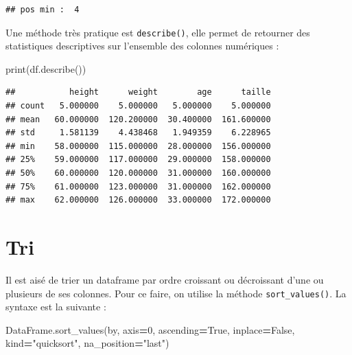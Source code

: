 \documentclass[
  12pt,
]{book}
\newenvironment{Shaded}{\begin{snugshade}}{\end{snugshade}}
\newcommand{\BuiltInTok}[1]{#1}
\newcommand{\DecValTok}[1]{\textcolor[rgb]{0.00,0.00,0.81}{#1}}
\newcommand{\NormalTok}[1]{#1}
\newcommand{\OperatorTok}[1]{\textcolor[rgb]{0.81,0.36,0.00}{\textbf{#1}}}
\newcommand{\StringTok}[1]{\textcolor[rgb]{0.31,0.60,0.02}{#1}}
\newcommand{\VariableTok}[1]{\textcolor[rgb]{0.00,0.00,0.00}{#1}}
\numberwithin{equation}{section}
\numberwithin{countremarque}{section}
\begin{document}
\begin{lstlisting}
## pos min :  4
\end{lstlisting}

Une méthode très pratique est \texttt{describe()}, elle permet de retourner des statistiques descriptives sur l'ensemble des colonnes numériques :

\begin{Shaded}
\begin{Highlighting}[]
\BuiltInTok{print}\NormalTok{(df.describe())}
\end{Highlighting}
\end{Shaded}

\begin{lstlisting}
##           height      weight        age      taille
## count   5.000000    5.000000   5.000000    5.000000
## mean   60.000000  120.200000  30.400000  161.600000
## std     1.581139    4.438468   1.949359    6.228965
## min    58.000000  115.000000  28.000000  156.000000
## 25%    59.000000  117.000000  29.000000  158.000000
## 50%    60.000000  120.000000  31.000000  160.000000
## 75%    61.000000  123.000000  31.000000  162.000000
## max    62.000000  126.000000  33.000000  172.000000
\end{lstlisting}

\section{Tri}\label{tri-2}

Il est aisé de trier un dataframe par ordre croissant ou décroissant d'une ou plusieurs de ses colonnes. Pour ce faire, on utilise la méthode \texttt{sort\_values()}. La syntaxe est la suivante :

\begin{Shaded}
\begin{Highlighting}[]
\NormalTok{DataFrame.sort\_values(by, axis}\OperatorTok{=}\DecValTok{0}\NormalTok{, ascending}\OperatorTok{=}\VariableTok{True}\NormalTok{,}
\NormalTok{                      inplace}\OperatorTok{=}\VariableTok{False}\NormalTok{, kind}\OperatorTok{=}\StringTok{"quicksort"}\NormalTok{,}
\NormalTok{                      na\_position}\OperatorTok{=}\StringTok{"last"}\NormalTok{)}
\end{Highlighting}
\end{Shaded}
\end{document}
